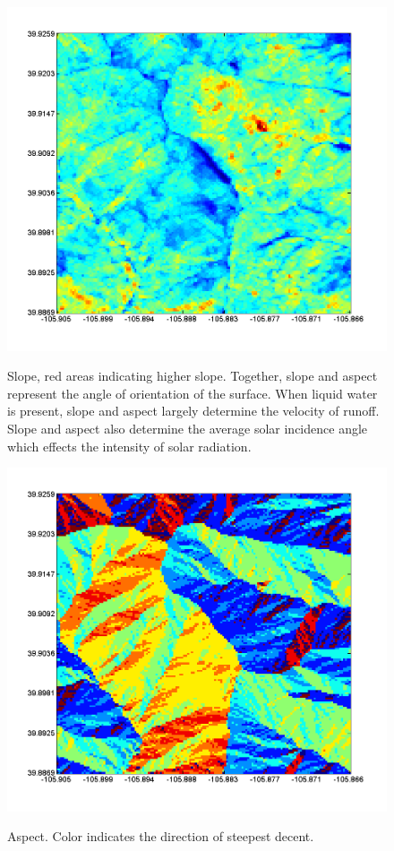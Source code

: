\documentclass[fleqn, letterpaper]{tufte-handout}
\begin{document}
\begin{figure}
	\includegraphics[width=\textwidth]{slope}
	\label{slope}
	\caption{Slope, red areas indicating higher slope. Together, slope and aspect represent the angle of orientation of the surface. When liquid water is present, slope and aspect largely determine the velocity of runoff. 
Slope and aspect also determine the average solar incidence angle which effects the intensity of solar radiation.}
\end{figure}
\begin{figure}
	\includegraphics[width=\textwidth]{aspect}
	\label{aspect}
	\caption{Aspect. Color indicates the direction of steepest decent.}
\end{figure}
\end{document}
